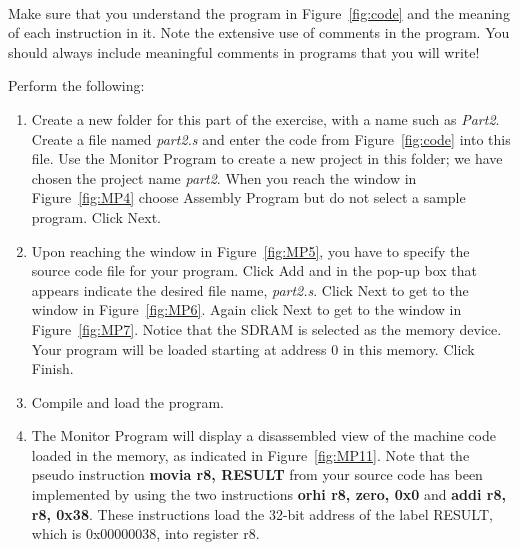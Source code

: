 \documentclass[epsfig,10pt,fullpage]{article}
\begin{document}
~\\
Make sure that you understand the program in Figure~\ref{fig:code} and the meaning of each 
instruction in it. Note the extensive use of comments in the program.
You should always include meaningful comments in programs that you will write!

Perform the following:

\begin{enumerate}
\item Create a new folder for this part of the exercise, with a name such as {\it Part2}.  
Create a file named {\it part2.s} and enter the code from Figure~\ref{fig:code} into this
file.  Use the Monitor Program to create a new project in this folder; we have chosen the 
project name {\it part2}.  When you reach the window in Figure~\ref{fig:MP4} 
choose {\sf Assembly Program} but do not select a sample program. Click {\sf Next}.
\item Upon reaching the window in Figure~\ref{fig:MP5}, you have to specify the source
		  code file for your program.
Click {\sf Add} and in the pop-up box that appears indicate the desired file name,
{\it part2.s}.  Click {\sf Next} to get to the window in Figure~\ref{fig:MP6}. 
Again click {\sf Next} to get to the window in Figure~\ref{fig:MP7}. Notice that the 
SDRAM is selected as the memory device.  Your program will be loaded starting at
address 0 in this memory.  Click {\sf Finish}.
\item Compile and load the program.

\item The Monitor Program will display a disassembled view of the machine code loaded
		  in the memory, as indicated in Figure~\ref{fig:MP11}. 
Note that the pseudo instruction {\bf movia r8, RESULT} from your source code
has been implemented by using the two instructions {\bf orhi r8, zero, 0x0} and 
{\bf addi r8, r8, 0x38}.  These instructions load the 32-bit address of the label RESULT,
which is {\sf 0x00000038}, into register r8.


\end{enumerate}
\end{document}
